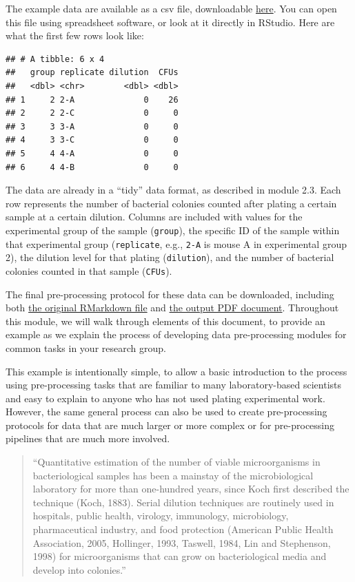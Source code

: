 \documentclass[]{tufte-book}
\begin{document}
The example data are available as a csv file, downloadable \href{https://raw.githubusercontent.com/geanders/improve_repro/master/data/bactcountr_example_data/cfu_data.csv}{here}.
You can open this file using spreadsheet software, or look at it directly in
RStudio. Here are what the first few rows look like:

\begin{verbatim}
## # A tibble: 6 x 4
##   group replicate dilution  CFUs
##   <dbl> <chr>        <dbl> <dbl>
## 1     2 2-A              0    26
## 2     2 2-C              0     0
## 3     3 3-A              0     0
## 4     3 3-C              0     0
## 5     4 4-A              0     0
## 6     4 4-B              0     0
\end{verbatim}

The data are already in a ``tidy'' data format, as described in module 2.3. Each
row represents the number of bacterial colonies counted after plating a certain
sample at a certain dilution. Columns are included with values for the
experimental group of the sample (\texttt{group}), the specific ID of the sample within
that experimental group (\texttt{replicate}, e.g., \texttt{2-A} is mouse A in experimental
group 2), the dilution level for that plating (\texttt{dilution}), and the number of
bacterial colonies counted in that sample (\texttt{CFUs}).

The final pre-processing protocol for these data can be downloaded, including
both \href{https://raw.githubusercontent.com/geanders/improve_repro/master/data/bactcountr_example_data/example_protocol.Rmd}{the original RMarkdown
file}
and \href{https://github.com/geanders/improve_repro/raw/master/data/bactcountr_example_data/example_protocol.pdf}{the output PDF
document}.
Throughout this module, we will walk through elements of this document, to
provide an example as we explain the process of developing data pre-processing
modules for common tasks in your research group.

This example is intentionally simple, to allow a basic introduction to the
process using pre-processing tasks that are familiar to many laboratory-based
scientists and easy to explain to anyone who has not used plating experimental
work. However, the same general process can also be used to create
pre-processing protocols for data that are much larger or more complex or for
pre-processing pipelines that are much more involved.

\begin{quote}
``Quantitative estimation of the number of viable microorganisms in
bacteriological samples has been a mainstay of the microbiological laboratory
for more than one-hundred years, since Koch first described the technique (Koch,
1883). Serial dilution techniques are routinely used in hospitals, public
health, virology, immunology, microbiology, pharmaceutical industry, and food
protection (American Public Health Association, 2005, Hollinger, 1993, Taswell,
1984, Lin and Stephenson, 1998) for microorganisms that can grow on
bacteriological media and develop into colonies.'' \citep{ben2014estimation}
\end{quote}
\end{document}
